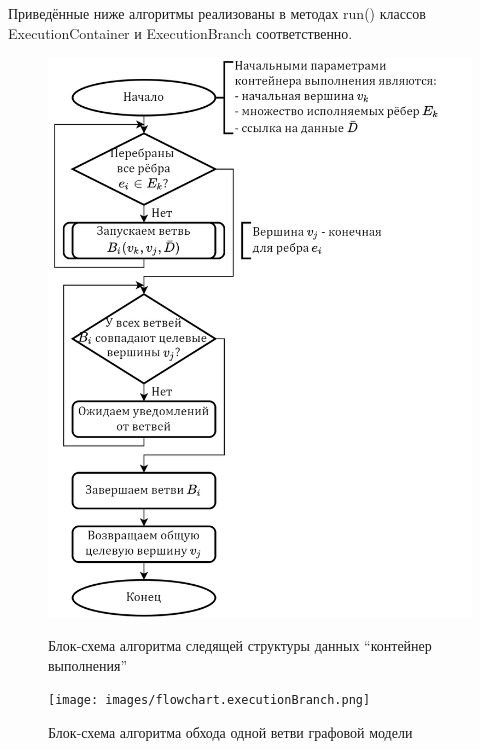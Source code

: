 \begin{frame}
    Приведённые ниже алгоритмы реализованы в методах run() классов ExecutionContainer и ExecutionBranch соответственно.

    \begin{figure}
        \begin{minipage}{0.35\textwidth}
            \centering
            \includegraphics[height=0.6\textheight]{images/flowchart.executionContainer.png}
            \caption{Блок-схема алгоритма следящей структуры данных ``контейнер выполнения''}
        \end{minipage}\hfill\begin{minipage}{0.645\textwidth}
            \centering
            \texttt{[image: images/flowchart.executionBranch.png]}
            \caption{Блок-схема алгоритма обхода одной ветви графовой модели}
        \end{minipage}
    \end{figure}

\end{frame}
